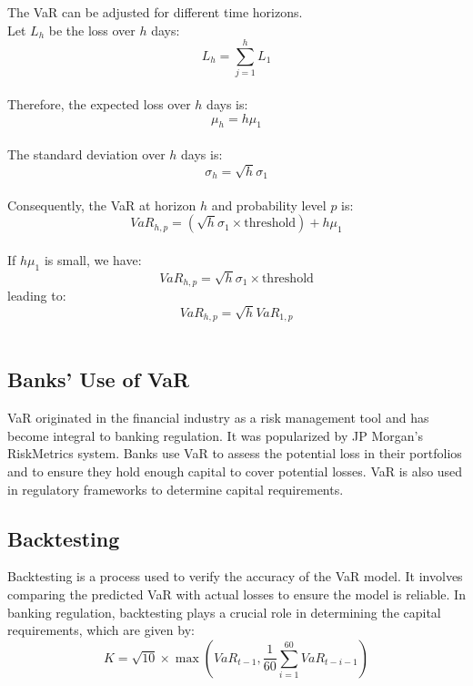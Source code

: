 \documentclass[a4paper,10pt]{article}
\begin{document}
\noindent The VaR can be adjusted for different time horizons. \\
\noindent Let \(L_h\) be the loss over \(h\) days:\\
\noindent \[L_h = \sum_{j=1}^{h} L_1\]\\
\noindent Therefore, the expected loss over \(h\) days is:\\
\noindent \[\mu_h = h\mu_1\]\\
\noindent The standard deviation over \(h\) days is:\\
\noindent \[\sigma_h = \sqrt{h}\sigma_1\]\\
\noindent Consequently, the VaR at horizon \(h\) and probability level \(p\) is:\\
\noindent \[VaR_{h,p} = (\sqrt{h}\sigma_1 \times \text{threshold}) + h\mu_1\]\\
\noindent If \(h\mu_1\) is small, we have:\\
\noindent \[VaR_{h,p} = \sqrt{h}\sigma_1 \times \text{threshold}\] leading to:\\
\noindent \[VaR_{h,p} = \sqrt{h} VaR_{1,p}\]\\

\subsection{Banks' Use of VaR}

\noindent VaR originated in the financial industry as a risk management tool and has become integral to banking regulation. It was popularized by JP Morgan's RiskMetrics system. Banks use VaR to assess the potential loss in their portfolios and to ensure they hold enough capital to cover potential losses. VaR is also used in regulatory frameworks to determine capital requirements.\\

\subsection{Backtesting}

\noindent Backtesting is a process used to verify the accuracy of the VaR model. It involves comparing the predicted VaR with actual losses to ensure the model is reliable. In banking regulation, backtesting plays a crucial role in determining the capital requirements, which are given by:\\
\[K = \sqrt{10} \times \max\left( VaR_{t-1}, \frac{1}{60} \sum_{i=1}^{60} VaR_{t-i-1} \right)\]\\
\end{document}
